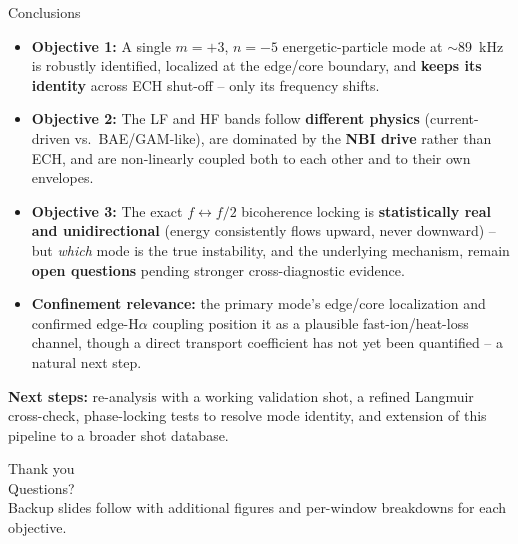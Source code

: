 \documentclass[aspectratio=169]{beamer}
\begin{document}
\begin{frame}{Conclusions}
    \footnotesize
    \begin{itemize}
        \item \textbf{Objective 1:} A single $m=+3$, $n=-5$ energetic-particle
        mode at $\sim$\SI{89}{kHz} is robustly identified, localized at the
        edge/core boundary, and \textbf{keeps its identity} across ECH
        shut-off -- only its frequency shifts.
        \item \textbf{Objective 2:} The LF and HF bands follow
        \textbf{different physics} (current-driven vs.\ BAE/GAM-like), are
        dominated by the \textbf{NBI drive} rather than ECH, and are
        non-linearly coupled both to each other and to their own envelopes.
        \item \textbf{Objective 3:} The exact $f\leftrightarrow f/2$
        bicoherence locking is \textbf{statistically real and
        unidirectional} (energy consistently flows upward, never downward)
        -- but \emph{which} mode is the true instability, and the underlying
        mechanism, remain \textbf{open questions} pending stronger
        cross-diagnostic evidence.
        \item \textbf{Confinement relevance:} the primary mode's edge/core
        localization and confirmed edge-H$\alpha$ coupling position it as a
        plausible fast-ion/heat-loss channel, though a direct transport
        coefficient has not yet been quantified -- a natural next step.
    \end{itemize}
    \vspace{0.2cm}
    \textbf{Next steps:} re-analysis with a working validation shot, a
    refined Langmuir cross-check, phase-locking tests to resolve mode
    identity, and extension of this pipeline to a broader shot database.
\end{frame}

\begin{frame}
    \begin{center}
        {\Huge Thank you}\\[0.5cm]
        {\Large Questions?}\\[1.0cm]
        {\small Backup slides follow with additional figures and
        per-window breakdowns for each objective.}
    \end{center}
\end{frame}

\appendix
\end{document}
